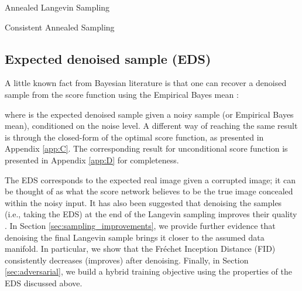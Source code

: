 \documentclass{article} \usepackage{iclr2021_conference_notitle,times}
\theoremstyle{definition}
\theoremstyle{definition}
\begin{document}
\begin{minipage}{0.49\textwidth}
\begin{algorithm}[H]
	\caption{Annealed Langevin Sampling}
	\label{alg:anneal1}
	\begin{algorithmic}[1]
	    \vspace{0.06cm}
	    \vspace{0.12cm}
\State{}
                \State{}
            \EndFor
        \EndFor
        \item[]
        \Return{}
        
	\end{algorithmic}
\end{algorithm}
\end{minipage}
\hfill
\begin{minipage}{0.50\textwidth}
\begin{algorithm}[H]
	\caption{ Consistent Annealed Sampling}
	\label{alg:anneal2}
	\begin{algorithmic}[1]
	    \Require{, } 
\State{}
	        \State{}
           \State{}
        \EndFor
        \item[]
        \Return{}
	\end{algorithmic}
\end{algorithm}
\end{minipage}

\subsection{Expected denoised sample (EDS)}\label{sec:EDS}

A little known fact from Bayesian literature is that one can recover a denoised sample from the score function using the Empirical Bayes mean \citep{robbins1955empirical,miyasawa1961empirical, raphan2011least}:

where  is the expected denoised sample given a noisy sample (or Empirical Bayes mean), conditioned on the noise level. A different way of reaching the same result is through the closed-form of the optimal score function, as presented in Appendix \ref{app:C}. The corresponding result for unconditional score function is presented in Appendix \ref{app:D} for completeness.

The EDS corresponds to the expected real image given a corrupted image; it can be thought of as what the score network believes to be the true image concealed within the noisy input. It has also been suggested that denoising the samples (i.e., taking the EDS) at the end of the Langevin sampling improves their quality \citep{saremi2019neural, li2019learning, kadkhodaie2020solving}. In Section \ref{sec:sampling_improvements}, we provide further evidence that denoising the final Langevin sample brings it closer to the assumed data manifold. In particular, we show that the Fréchet Inception Distance (FID) consistently decreases (improves) after denoising. Finally, in Section \ref{sec:adversarial}, we build a hybrid training objective using the properties of the EDS discussed above.
\end{document}
